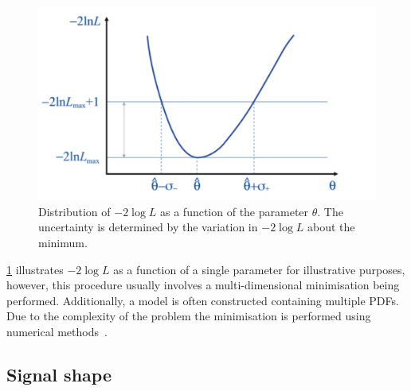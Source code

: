 \begin{figure}
\centering
\includegraphics[width=0.7\linewidth]{figures/fitComponents/likelihood.pdf}
\caption{Distribution of $-2\log L$ as a function of the parameter $\theta$. The uncertainty is determined by the variation in $-2\log L$ about the minimum.}
\label{fig:likelihood}
\end{figure}

\Fig\ref{fig:likelihood} illustrates $-2\log L$ as a function of a single parameter for illustrative purposes, however, this procedure usually involves a multi-dimensional minimisation being performed. Additionally, a model is often constructed containing multiple PDFs. Due to the complexity of the problem the minimisation is performed using numerical methods~\cite{minuit}.


\subsection{Signal shape}
\label{sec:massfit:signal}


